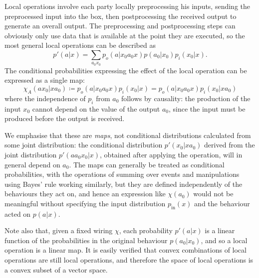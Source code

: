 \documentclass[10pt, a4paper]{article}
\numberwithin{equation}{section} %
\theoremstyle{definition}
\theoremstyle{plain}
\newcommand{\?}{\mathrel{?}} %
\newcommand{\prin}[1][p]{#1_{\mathrm{in}}}
\begin{document}
              Local operations involve each party locally preprocessing his inputs, sending the preprocessed input into the box, then postprocessing the received output to generate an overall output. The preprocessing and postprocessing steps can obviously only use data that is available at the point they are executed, so the most general local operations can be described as~\cite[Def. 4]{LocalTransformations}
              \begin{equation}
                p'(a|x) = \sum_{a_0 x_0} p_o(a|x_0 a_0 x) p(a_0|x_0) p_i(x_0|x).
              \end{equation}
              The conditional probabilities expressing the effect of the local operation can be expressed as a single map:
              \begin{equation}\label{eqn:opmap}
                \chi_A(a x_0 | x a_0) \coloneqq p_o(a|x_0a_0x) p_i(x_0|x) = p_o(a|x_0a_0x) p_i(x_0|x a_0)
              \end{equation}
              where the independence of \(p_i\) from \(a_0\) follows by causality: the production of the input \(x_0\) cannot depend on the value of the output \(a_0\), since the input must be produced before the output is received.

              We emphasise that these are \emph{maps}, not conditional distributions calculated from some joint distribution: the conditional distribution \(p'(x_0|x a_0)\) derived from the joint distribution \(p'(a a_0 x_0|x)\), obtained after applying the operation, will in general depend on \(a_0\). The maps can generally be treated as conditional probabilities, with the operations of summing over events and manipulations using Bayes' rule working similarly, but they are defined independently of the behaviours they act on, and hence an expression like \(\chi(a_0)\) would not be meaningful without specifying the input distribution \(\prin(x)\) and the behaviour acted on \(p(a|x)\).

              Note also that, given a fixed wiring \(\chi\), each probability \(p'(a|x)\) is a linear function of the probabilities in the original behaviour \(p(a_0|x_0)\), and so a local operation is a linear map. It is easily verified that convex combinations of local operations are still local operations, and therefore the space of local operations is a convex subset of a vector space.
\end{document}

